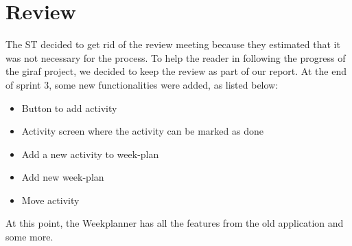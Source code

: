 \section{Review}

The \gls{ST} decided to get rid of the review meeting because they estimated that it was not necessary for the process. To help the reader in following the progress of the \gls{giraf} project, we decided to keep the review as part of our report. At the end of sprint 3, some new functionalities were added, as listed below:

\begin{itemize}
    \item Button to add activity
    \item Activity screen where the activity can be marked as done
    \item Add a new activity to week-plan
    \item Add new week-plan
    \item Move activity
\end{itemize}

At this point, the Weekplanner has all the features from the old application and some more.
